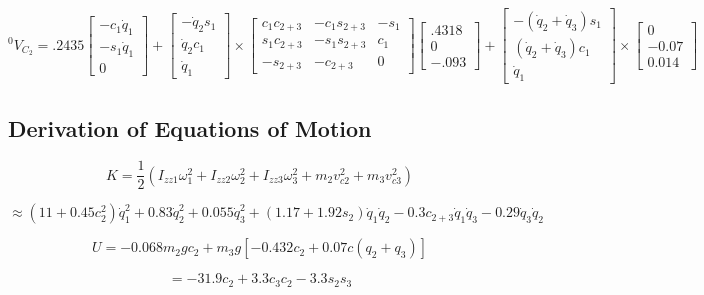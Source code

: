 $$
{}^{0}V_{C_{2}} = .2435 \begin{bmatrix} -c_1\dot{q}_1 \\ -s_1\dot{q}_1 \\ 0\end{bmatrix} + \left[\begin{array}{c} -\dot{q}_{2}s_{1} \\ \dot{q}_{2}c_{1} \\ \dot{q}_{1}
\end{array}\right] \times \left[\begin{array}{ccc}
c_{1} c_{2+3} & -c_{1} s_{2+3} & -s_{1} \\
s_{1} c_{2+3} & -s_{1} s_{2+3} & c_{1} \\
-s_{2+3} & -c_{2+3} & 0
\end{array}\right] \begin{bmatrix} .4318 \\ 0 \\ -.093 \end{bmatrix} + \begin{bmatrix}
-(\dot{q}_2 + \dot{q}_3)s_1 \\
(\dot{q}_2 + \dot{q}_3)c_1 \\
\dot{q}_1
\end{bmatrix} \times \begin{bmatrix}
0 \\ -0.07 \\ 0.014
\end{bmatrix}
$$




\subsection*{Derivation of Equations of Motion}



$$
K=\frac{1}{2}\left(I_{z z 1} \omega_{1}^{2}+I_{z z 2} \omega_{2}^{2}+I_{z z 3} \omega_{3}^{2}+m_{2} v_{c 2}^{2}+m_{3} v_{c 3}^{2}\right)
$$

$$
\approx\left(11+0.45 c_{2}^{2}\right) \dot{q}_{1}^{2}+0.83 \dot{q}_{2}^{2}+0.055 \dot{q}_{3}^{2}+\left(1.17+1.92 s_{2}\right) \dot{q}_{1} \dot{q}_{2}-0.3 c_{2+3} \dot{q}_{1} \dot{q}_{3}-0.29 \dot{q}_{3} \dot{q}_{2}
$$



$$
U=-0.068 m_{2} g c_{2}+m_{3} g\left[-0.432 c_{2}+0.07 c\left(q_{2}+q_{3}\right)\right]
$$


$$
=-31.9 c_{2}+3.3 c_{3} c_{2}-3.3 s_{2} s_{3}
$$




